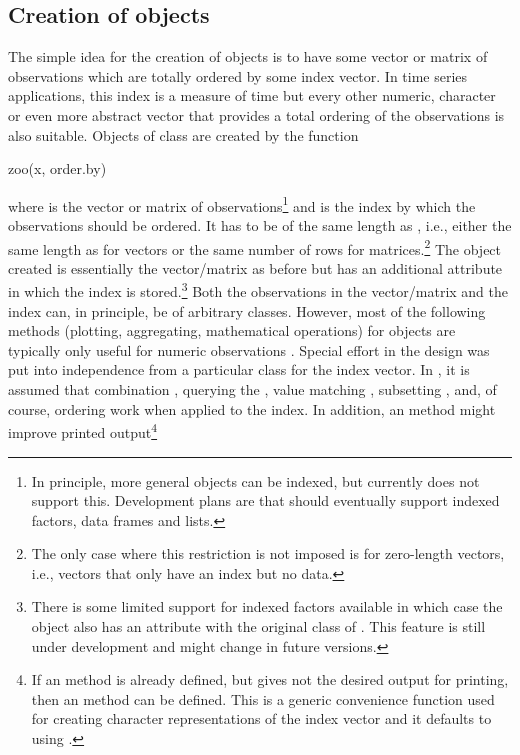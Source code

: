 \documentclass[article,nojss]{jss}
\begin{document}
\subsection[Creation of "zoo" objects]{Creation of  objects}
\label{sec:zoo}

The simple idea for the creation of  objects is to have
some vector or matrix of observations  which are totally ordered
by some index vector. In time series applications, this index is a measure of
time but every other numeric, character or even more abstract vector that
provides a total ordering of the observations is also suitable. Objects
of class  are created by the function
\begin{Scode}
zoo(x, order.by)
\end{Scode}
where  is the vector or matrix of observations\footnote{In principle,
more general objects can be indexed, but currently  does not support this.
Development plans are that  should eventually support indexed factors,
data frames and lists.} and 
is the index by which the observations should be ordered. It has to be
of the same length as , i.e., either the same length as 
for vectors or the same number of rows for matrices.\footnote{The only case
where this restriction is not imposed is for zero-length vectors, i.e., vectors
that only have an index but no data.} The  object
created is essentially the vector/matrix as before but has an additional
 attribute in which the index is stored.\footnote{There is some
limited support for indexed factors available in which case the 
object also has an attribute  with the original class
of . This feature is still under development and might change in future
versions.} Both the observations in the vector/matrix 
and the index  can, in principle, be of arbitrary classes. However, most of the
following methods (plotting, aggregating, mathematical operations) for 
objects are typically only useful for numeric observations . Special
effort in the design was put into independence from a particular class for
the index vector. In , it is assumed that combination ,
querying the , value matching , subsetting \code{[},
and, of course, ordering  work when applied to the index. 
In addition, an  method might improve printed output\footnote{If
an  method is already defined, but gives not the desired
output for printing, then an  method can be defined. This is a
generic convenience function used for creating character representations of the
index vector and it defaults to using .}
\end{document}
